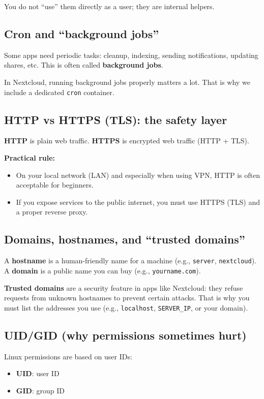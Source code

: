 You do not ``use'' them directly as a user; they are internal helpers.

\subsection{Cron and ``background jobs''}
Some apps need periodic tasks: cleanup, indexing, sending notifications, updating shares, etc.
This is often called \textbf{background jobs}.

In Nextcloud, running background jobs properly matters a lot.
That is why we include a dedicated \texttt{cron} container.

\subsection{HTTP vs HTTPS (TLS): the safety layer}
\textbf{HTTP} is plain web traffic. \textbf{HTTPS} is encrypted web traffic (HTTP + TLS).

\textbf{Practical rule:}
\begin{itemize}[leftmargin=*]
  \item On your local network (LAN) and especially when using VPN, HTTP is often acceptable for beginners.
  \item If you expose services to the public internet, you must use HTTPS (TLS) and a proper reverse proxy.
\end{itemize}


\subsection{Domains, hostnames, and ``trusted domains''}
A \textbf{hostname} is a human-friendly name for a machine (e.g., \texttt{server}, \texttt{nextcloud}).
A \textbf{domain} is a public name you can buy (e.g., \texttt{yourname.com}).

\textbf{Trusted domains} are a security feature in apps like Nextcloud:
they refuse requests from unknown hostnames to prevent certain attacks.
That is why you must list the addresses you use (e.g., \texttt{localhost}, \texttt{SERVER\_IP}, or your domain).

\subsection{UID/GID (why permissions sometimes hurt)}
Linux permissions are based on user IDs:
\begin{itemize}[leftmargin=*]
  \item \textbf{UID}: user ID
  \item \textbf{GID}: group ID
\end{itemize}

